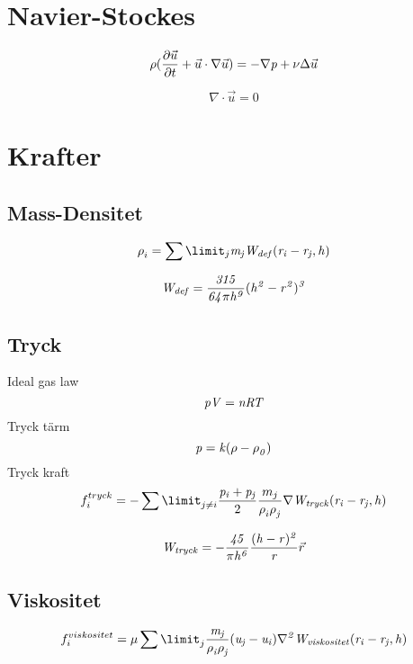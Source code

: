 \documentclass[a4paper,12pt,oneside,final]{extarticle}
\begin{document}
\section{Navier-Stockes}
\begin{equation}
\rho(\frac{\partial \vec{u}}{\partial t} + \vec{u} \cdot \nabla \vec{u}) =  -\nabla {\it p} + \nu \Delta \vec{u}
\end{equation}

\begin{equation}
\nabla \cdot \vec{u} = 0
\end{equation}


\section{Krafter}
\subsection{Mass-Densitet}

\begin{equation}
\rho^{}_{i} = \sum\limit_{j} {\it m_j W_{def} (r_i-r_j,h)}
\end{equation}

\begin{equation}
{\it W_{def} = \frac{315}{64 \pi h^9}(h^2-r^2)^3}
\end{equation}

\subsection{Tryck}
Ideal gas law
\begin{equation}
{\it pV = nRT}
\end{equation}
Tryck tärm
\begin{equation}
{\it p = k(\rho - \rho^{}_{0})}
\end{equation}
Tryck kraft
\begin{equation}
f^{tryck}_i = - \sum \limit^{}_{j \neq i} \frac{\it p_i + p_j}{2} \frac{m_j}{\rho^{}_{i} \rho^{}_{j}} \nabla {\it W_{tryck} (r_i - r_j,h)}
\end{equation}

\begin{equation}
{\it W_{tryck} = -\frac{45}{\pi h^6}\frac{(h-r)^2}{r}} \vec{r}
\end{equation}

\subsection{Viskositet}
\begin{equation}
f^{viskositet}_i = \mu \sum \limit^{}_{j} {\it \frac{m_j}{\rho^{}_{i} \rho^{}_{j}} (u_j - u_i) \nabla^{2}_{} W_{viskositet} (r_i - r_j,h)}
\end{equation}
\end{document}
